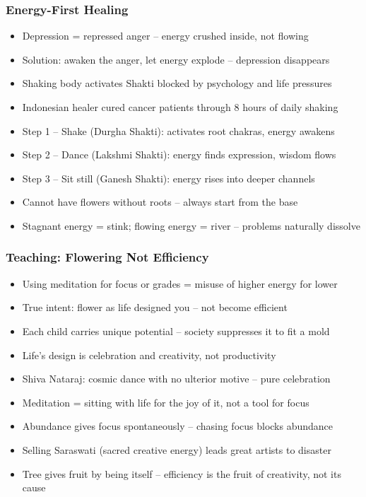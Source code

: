 \begin{frame}[fragile]\frametitle{Energy-First Healing}
  \begin{itemize}
    \item Depression = repressed anger -- energy crushed inside, not flowing
    \item Solution: awaken the anger, let energy explode -- depression disappears
    \item Shaking body activates Shakti blocked by psychology and life pressures
    \item Indonesian healer cured cancer patients through 8 hours of daily shaking
    \item Step 1 -- Shake (Durgha Shakti): activates root chakras, energy awakens
    \item Step 2 -- Dance (Lakshmi Shakti): energy finds expression, wisdom flows
    \item Step 3 -- Sit still (Ganesh Shakti): energy rises into deeper channels
    \item Cannot have flowers without roots -- always start from the base
    \item Stagnant energy = stink; flowing energy = river -- problems naturally dissolve
  \end{itemize}
\end{frame}

\begin{frame}[fragile]\frametitle{Teaching: Flowering Not Efficiency}
  \begin{itemize}
    \item Using meditation for focus or grades = misuse of higher energy for lower
    \item True intent: flower as life designed you -- not become efficient
    \item Each child carries unique potential -- society suppresses it to fit a mold
    \item Life's design is celebration and creativity, not productivity
    \item Shiva Nataraj: cosmic dance with no ulterior motive -- pure celebration
    \item Meditation = sitting with life for the joy of it, not a tool for focus
    \item Abundance gives focus spontaneously -- chasing focus blocks abundance
    \item Selling Saraswati (sacred creative energy) leads great artists to disaster
    \item Tree gives fruit by being itself -- efficiency is the fruit of creativity, not its cause
  \end{itemize}
\end{frame}

